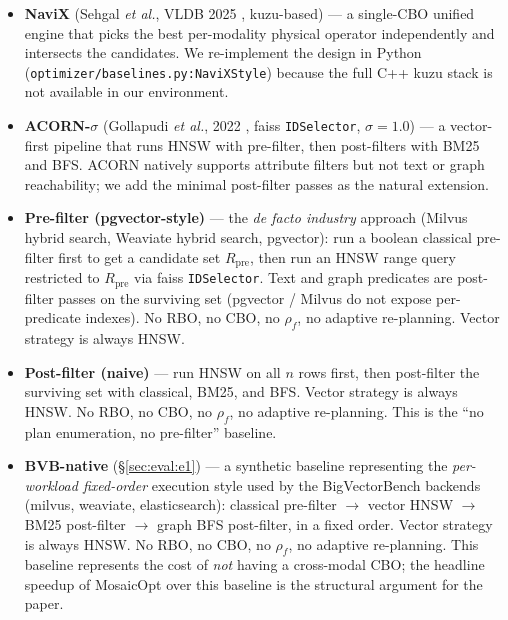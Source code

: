\documentclass[sigconf,nonacm,review]{acmart}
\theoremstyle{plain}
\theoremstyle{definition}
\theoremstyle{remark}
\begin{document}
\begin{itemize}[leftmargin=*, itemsep=1pt]
  \item \textbf{NaviX} (Sehgal \textit{et al.}, VLDB 2025
    \cite{sehgal2025navix}, kuzu-based) --- a single-CBO
    unified engine that picks the best per-modality
    physical operator independently and intersects the
    candidates.  We re-implement the design in Python
    (\texttt{optimizer/baselines.py:NaviXStyle}) because the
    full C++ kuzu stack is not available in our environment.
  \item \textbf{ACORN-$\sigma$} (Gollapudi \textit{et al.}, 2022
    \cite{acorn2022}, faiss \texttt{IDSelector}, $\sigma = 1.0$) ---
    a vector-first pipeline that runs HNSW with pre-filter,
    then post-filters with BM25 and BFS.  ACORN natively supports
    attribute filters but not text or graph reachability;
    we add the minimal post-filter passes as the natural extension.
  \item \textbf{Pre-filter (pgvector-style)} --- the
    \emph{de facto industry} approach (Milvus hybrid search,
    Weaviate hybrid search, pgvector): run a boolean
    classical pre-filter first to get a candidate set
    $R_{\text{pre}}$, then run an HNSW range query
    restricted to $R_{\text{pre}}$ via faiss
    \texttt{IDSelector}.  Text and graph predicates are
    post-filter passes on the surviving set (pgvector /
    Milvus do not expose per-predicate indexes).  No RBO,
    no CBO, no $\rho_f$, no adaptive re-planning.  Vector
    strategy is always HNSW.
  \item \textbf{Post-filter (naive)} --- run HNSW on all
    $n$ rows first, then post-filter the surviving set with
    classical, BM25, and BFS.  Vector strategy is always
    HNSW.  No RBO, no CBO, no $\rho_f$, no adaptive
    re-planning.  This is the ``no plan enumeration, no
    pre-filter'' baseline.
  \item \textbf{BVB-native} (\S\ref{sec:eval:e1}) --- a synthetic
    baseline representing the \emph{per-workload fixed-order}
    execution style used by the BigVectorBench backends
    (milvus, weaviate, elasticsearch): classical pre-filter
    $\to$ vector HNSW $\to$ BM25 post-filter $\to$ graph BFS
    post-filter, in a fixed order.  Vector strategy is always HNSW.
    No RBO, no CBO, no $\rho_f$, no adaptive re-planning.
    This baseline represents the cost of \emph{not} having a
    cross-modal CBO; the headline speedup of MosaicOpt over
    this baseline is the structural argument for the paper.
\end{itemize}
\end{document}
